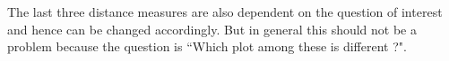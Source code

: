 \documentclass[12]{article}
\newcommand{\red}[1]{{\color{red} #1}}
\newcommand{\green}[1]{{\color{cyan} #1}}
\begin{document}
The last three distance measures are also dependent on the question of interest and hence can be changed accordingly. But in general this should not be a problem because the question is ``Which plot among these is different ?". 
%
%
%
%
\end{document}
